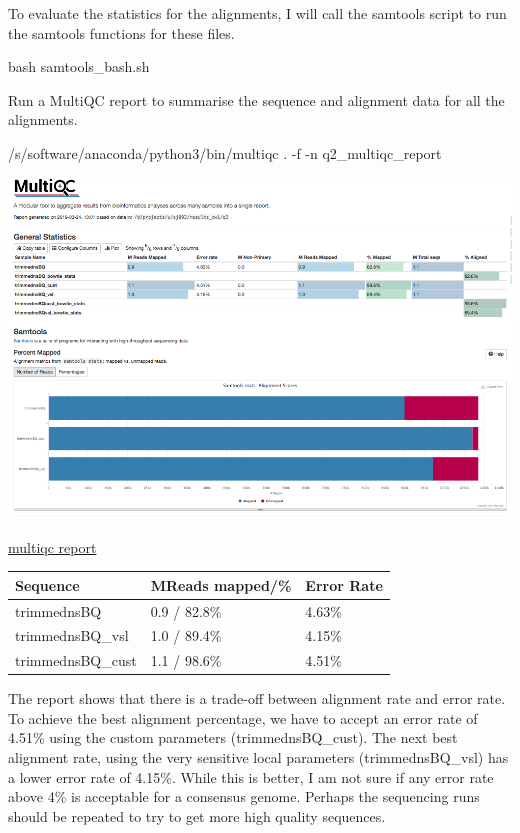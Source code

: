 \documentclass[]{article}
\newenvironment{Shaded}{\begin{snugshade}}{\end{snugshade}}
\newcommand{\FunctionTok}[1]{\textcolor[rgb]{0.00,0.00,0.00}{#1}}
\newcommand{\ExtensionTok}[1]{#1}
\newcommand{\NormalTok}[1]{#1}
\begin{document}
To evaluate the statistics for the alignments, I will call the samtools
script to run the samtools functions for these files.

\begin{Shaded}
\begin{Highlighting}[]
\FunctionTok{bash}\NormalTok{ samtools_bash.sh}
\end{Highlighting}
\end{Shaded}

Run a MultiQC report to summarise the sequence and alignment data for
all the alignments.

\begin{Shaded}
\begin{Highlighting}[]
\ExtensionTok{/s/software/anaconda/python3/bin/multiqc}\NormalTok{ . -f -n q2_multiqc_report}
\end{Highlighting}
\end{Shaded}

\includegraphics{Multiqc_report_q2.png}

\href{/d/projects/u/sj003/results_cw1/q2_multiqc_report.html}{multiqc
report}

\begin{longtable}[]{@{}lll@{}}
\toprule
Sequence & MReads mapped/\% & Error Rate\tabularnewline
\midrule
\endhead
trimmednsBQ & 0.9 / 82.8\% & 4.63\%\tabularnewline
trimmednsBQ\_vsl & 1.0 / 89.4\% & 4.15\%\tabularnewline
trimmednsBQ\_cust & 1.1 / 98.6\% & 4.51\%\tabularnewline
\bottomrule
\end{longtable}

The report shows that there is a trade-off between alignment rate and
error rate. To achieve the best alignment percentage, we have to accept
an error rate of 4.51\% using the custom parameters (trimmednsBQ\_cust).
The next best alignment rate, using the very sensitive local parameters
(trimmednsBQ\_vsl) has a lower error rate of 4.15\%. While this is
better, I am not sure if any error rate above 4\% is acceptable for a
consensus genome. Perhaps the sequencing runs should be repeated to try
to get more high quality sequences.
\end{document}
